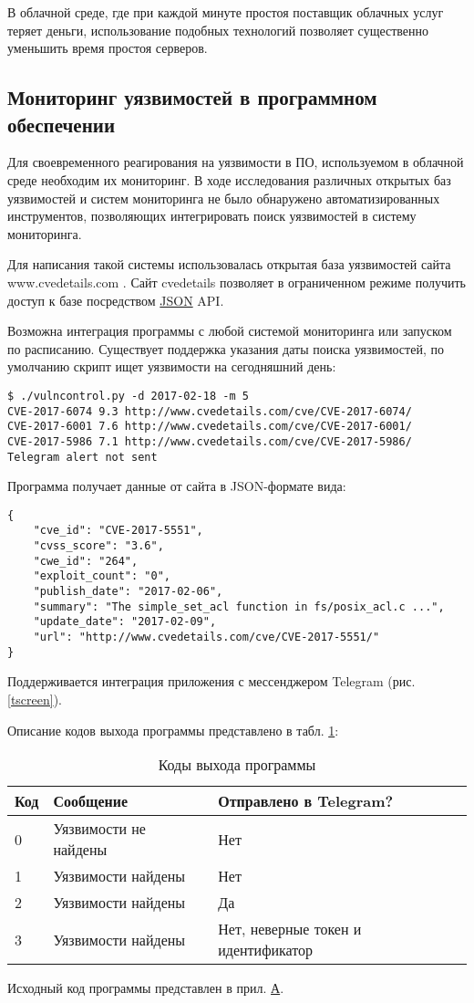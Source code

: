 В облачной среде, где при каждой минуте простоя поставщик облачных услуг теряет деньги, использование подобных технологий позволяет существенно уменьшить время простоя серверов.

\subsection{Мониторинг уязвимостей в программном обеспечении}

Для своевременного реагирования на уязвимости в ПО, используемом в облачной среде необходим их мониторинг.
В ходе исследования различных открытых баз уязвимостей и систем мониторинга не было обнаружено автоматизированных инструментов, позволяющих интегрировать поиск уязвимостей в систему мониторинга.

Для написания такой системы использовалась открытая база уязвимостей сайта www.cvedetails.com \cite{cvedetails}.
Сайт cvedetails позволяет в ограниченном режиме получить доступ к базе посредством \hyperlink{json}{JSON} API.

Возможна интеграция программы с любой системой мониторинга или запуском по расписанию.
Существует поддержка указания даты поиска уязвимостей, по умолчанию скрипт ищет уязвимости на сегодняшний день:
\begin{lstlisting}
$ ./vulncontrol.py -d 2017-02-18 -m 5
CVE-2017-6074 9.3 http://www.cvedetails.com/cve/CVE-2017-6074/
CVE-2017-6001 7.6 http://www.cvedetails.com/cve/CVE-2017-6001/
CVE-2017-5986 7.1 http://www.cvedetails.com/cve/CVE-2017-5986/
Telegram alert not sent
\end{lstlisting}

Программа получает данные от сайта в JSON-формате вида:
\begin{lstlisting}
{
    "cve_id": "CVE-2017-5551",
    "cvss_score": "3.6",
    "cwe_id": "264",
    "exploit_count": "0",
    "publish_date": "2017-02-06",
    "summary": "The simple_set_acl function in fs/posix_acl.c ...",
    "update_date": "2017-02-09",
    "url": "http://www.cvedetails.com/cve/CVE-2017-5551/"
}
\end{lstlisting}


Поддерживается интеграция приложения с мессенджером Telegram (рис. \ref{tscreen}).


Описание кодов выхода программы представлено в табл. \ref{exitcodes}:
\begin{table}[H]
  \caption{Коды выхода программы}\label{exitcodes}
  \begin{tabular}{|l|l|l|}
  \hline Код & Сообщение & Отправлено в Telegram? \\
  \hline 0 & Уязвимости не найдены & Нет \\
  \hline 1 & Уязвимости найдены & Нет \\
  \hline 2 & Уязвимости найдены & Да \\
  \hline 3 & Уязвимости найдены & Нет, неверные токен и идентификатор \\
  \hline
  \end{tabular}
\end{table}

Исходный код программы представлен в прил. \hyperlink{app-a}{А}.

\clearpage
